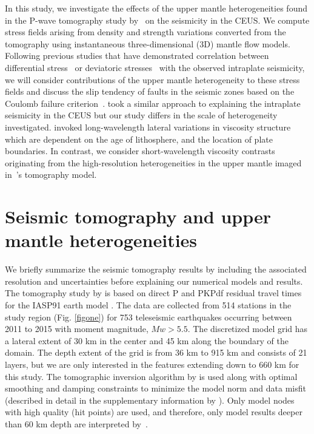 \documentclass[draft,linenumbers]{agujournal2018}
\begin{document}
In this study, we investigate the effects of the upper mantle heterogeneities found in the P-wave tomography study by~\citet{Biryol_2016} on the seismicity in the CEUS. We compute stress fields arising from density and strength variations converted from the tomography using instantaneous three-dimensional (3D) mantle flow models. %
Following previous studies that have demonstrated correlation between differential stress~\citep[e.g.,][]{baird2010relationship, zhan2016stress} or deviatoric stresses~\citep[e.g.,][]{levandowski2016dense} with the observed intraplate seismicity, 
we will consider contributions of the upper mantle heterogeneity to these stress fields and discuss the slip tendency of faults in the seismic zones based on the Coulomb failure criterion~\citep[e.g.,][]{king1994static, freed2005earthquake, li2007stress}. \citet{ghosh2019role} took a similar approach to explaining the intraplate seismicity in the CEUS but our study differs in the scale of heterogeneity investigated. \citet{ghosh2019role} invoked long-wavelength lateral variations in viscosity structure which are dependent on the age of lithosphere, and the location of plate boundaries. In contrast, we consider short-wavelength viscosity contrasts originating from the high-resolution heterogeneities in the upper mantle imaged in~\citet{Biryol_2016}\rq{}s tomography model. 


\section{Seismic tomography and upper mantle heterogeneities}

We briefly summarize the seismic tomography results by \citet{Biryol_2016} including the associated resolution and uncertainties before explaining our numerical models and results. The tomography study by \citet{Biryol_2016} is based on direct P and PKPdf residual travel times for the IASP91 earth model \citep{kennett1991traveltimes}. The data are collected from 514 stations in the study region (Fig. \ref{figone}) for 753 teleseismic earthquakes occurring between 2011 to 2015 with moment magnitude, $Mw > 5.5$. The discretized model grid has a lateral extent of 30 km in the center and 45 km along the boundary of the domain. The depth extent of the grid is from 36 km to 915 km and consists of 21 layers, but we are only interested in the features extending down to 660 km for this study. The tomographic inversion algorithm by \citet{schmandt2010seismic} is used along with optimal smoothing and damping constraints to minimize the model norm and data misfit (described in detail in the supplementary information by \citet{Biryol_2016}). Only model nodes with high quality (hit points) are used, and therefore, only model results deeper than 60 km depth are interpreted by~\citet{Biryol_2016}.
    
\end{document}
